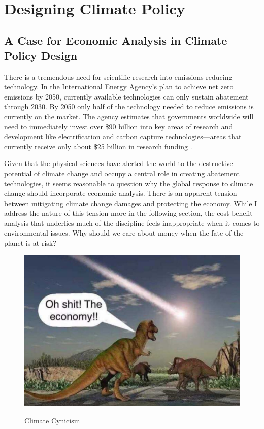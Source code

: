 ~
\newpage
\section{Designing Climate Policy}

\subsection{A Case for Economic Analysis in Climate Policy Design}

There is a tremendous need for scientific research into emissions reducing technology. In the International Energy Agency's plan to achieve net zero emissions by 2050, currently available technologies can only sustain abatement through 2030. By 2050 only half of the technology needed to reduce emissions is currently on the market. The agency estimates that governments worldwide will need to immediately invest over \$90 billion into key areas of research and development like electrification and carbon capture technologies---areas that currently receive only about \$25 billion in research funding \citep{ieareport}. 

Given that the physical sciences have alerted the world to the destructive potential of climate change and occupy a central role in creating abatement technologies, it seems reasonable to question why the global response to climate change should incorporate economic analysis. There is an apparent tension between mitigating climate change damages and protecting the economy. While I address the nature of this tension more in the following section, the cost-benefit analysis that underlies much of the discipline feels inappropriate when it comes to environmental issues. Why should we care about money when the fate of the planet is at risk?

\begin{figure}
	\centering
	\caption{Climate Cynicism}
	\includegraphics[scale=0.2]{figures/chapter2_figures/dino.jpg}\\
\end{figure}

